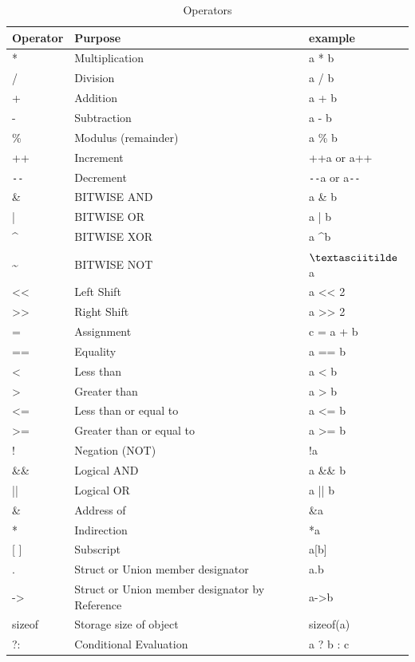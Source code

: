\documentclass[../main.tex]{subfiles}
\begin{document}
	\begin{table}[h]
		\centering
		\begin{tabular}{l l l}
			\toprule
			\textbf{Operator} & \textbf{Purpose} & \textbf{example}\\
			\midrule
			* 	& Multiplication 	& a * b \\
			/ 	& Division 			& a / b \\
			+ 	& Addition 			& a + b \\
			- 	& Subtraction 		& a - b \\
			\% 	& Modulus (remainder) & a \% b \\
			++ 	& Increment 		& ++a or a++ \\
			\verb|--| & Decrement 	& \verb|--|a or a\verb|--| \\
			\& 	& BITWISE AND 		& a \& b \\
			| 	& BITWISE OR 		& a | b \\
			\textasciicircum 	& BITWISE XOR 		& a \textasciicircum b \\
			\textasciitilde 	& BITWISE NOT 		& $\textasciitilde$a \\
			<< 	& Left Shift 		& a << 2 \\
			>> 	& Right Shift 		& a >> 2 \\
			= 	& Assignment 		& c = a + b \\
			==	& Equality 			& a == b \\
			<	& Less than			& a < b \\
			>	& Greater than		& a > b \\
			<=	& Less than or equal to & a <= b \\
			>=	& Greater than or equal to & a >= b \\
			!	& Negation (NOT)	& !a \\
			\&\&& Logical AND		& a \&\& b \\
			|| 	& Logical OR		& a || b \\
			\&	& Address of		& \&a \\
			*	& Indirection		& *a \\
			{[ ]}	& Subscript		& a[b] \\
			.	& Struct or Union member designator & a.b \\
			->	& Struct or Union member designator by Reference & a->b \\
			sizeof & Storage size of object & sizeof(a) \\
			?:	& Conditional Evaluation & a ? b : c \\
			\bottomrule
		\end{tabular}
		\caption{Operators}
		\label{tab:operators}
	\end{table}
\end{document}
